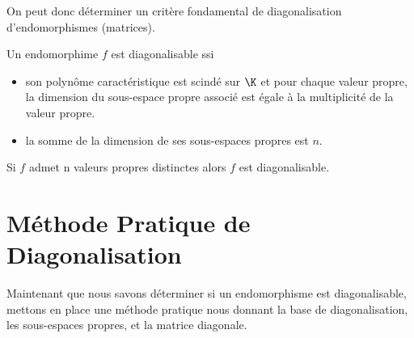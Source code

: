 On peut donc déterminer un critère fondamental de diagonalisation d'endomorphismes (matrices). 

\begin{criteria}
    Un endomorphime $f$ est diagonalisable ssi 
    \begin{itemize}
        \item son polynôme caractéristique est scindé sur $\K$ et pour chaque valeur propre, 
        la dimension du sous-espace propre associé est égale à la multiplicité de la valeur propre. 
        \item la somme de la dimension de ses sous-espaces propres est $n$. 
    \end{itemize}
\end{criteria}

\begin{corollary}
    Si $f$ admet n valeurs propres distinctes alors $f$ est diagonalisable. 
\end{corollary}


\section{Méthode Pratique de Diagonalisation}

Maintenant que nous savons déterminer si un endomorphisme est diagonalisable, mettons en place 
une méthode pratique nous donnant la base de diagonalisation, les sous-espaces propres, et la matrice diagonale. 

